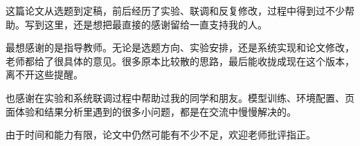 \begin{acknowledge}
    这篇论文从选题到定稿，前后经历了实验、联调和反复修改，过程中得到过不少帮助。写到这里，还是想把最直接的感谢留给一直支持我的人。

    最想感谢的是指导教师。无论是选题方向、实验安排，还是系统实现和论文修改，老师都给了很具体的意见。很多原本比较散的思路，最后能收拢成现在这个版本，离不开这些提醒。

    也感谢在实验和系统联调过程中帮助过我的同学和朋友。模型训练、环境配置、页面体验和结果分析里遇到的很多小问题，都是在交流中慢慢解决的。

    由于时间和能力有限，论文中仍然可能有不少不足，欢迎老师批评指正。
\end{acknowledge}
